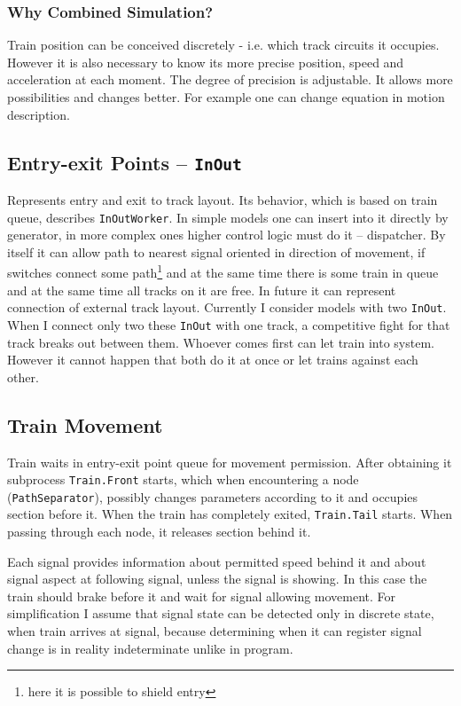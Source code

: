 \documentclass[english]{cls/fitthesis}
\newcommand{\cfr}[1]{\texttt{#1}}
\newcommand{\sourceRef}[1]{\cfr{#1}}
\begin{document}
    \subsubsection{Why Combined Simulation?}
      Train position can be conceived discretely - i.e. which track circuits it occupies.
      However it is also necessary to know its more precise position, speed and acceleration at each moment.
      The degree of precision is adjustable. It allows more possibilities and changes better. For example
      one can change equation in motion description.

    \subsection{Entry-exit Points -- \sourceRef{InOut}}
      Represents entry and exit to track layout.
      Its behavior, which is based on train queue, describes \sourceRef{InOutWorker}.
      In simple models one can insert into it directly by generator,
      in more complex ones higher control logic must do it -- dispatcher.
      By itself it can allow path to nearest signal oriented in direction of movement, if
      switches connect some path\footnote{here it is possible to shield entry}
      and at the same time there is some train in queue and at the same time all tracks on it are free.
      In future it can represent connection of external track layout.
      Currently I consider models with two \sourceRef{InOut}.
      When I connect only two these \sourceRef{InOut} with one track, a competitive
      fight for that track breaks out between them. Whoever comes first can let train into system. However it cannot
      happen that both do it at once or let trains against each other.

    \subsection{Train Movement} \label{trainMoveSection}
      Train waits in entry-exit point queue for movement permission. After obtaining it
      subprocess \sourceRef{Train.Front} starts, which when encountering a node
      (\sourceRef{PathSeparator}), possibly changes parameters according to it and occupies section before it.
      When the train has completely exited, \sourceRef{Train.Tail} starts. When passing through each node, it
      releases section behind it.

      Each signal provides information about permitted speed behind it and about signal aspect at
      following signal, unless the signal  is showing. In this case the
      train should brake before it and wait for signal allowing movement.
      For simplification I assume that signal state can be detected only in discrete state,
      when train arrives at signal, because determining when it can register signal
      change is in reality indeterminate unlike in program.
\end{document}
